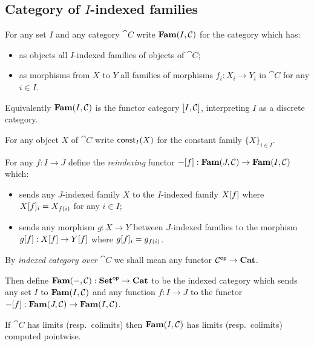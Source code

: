 \subsection{Category of $I$-indexed families}
\label{sec:fam}

\begin{definition}
For any set $I$ and any category $\cat{C}$ write $\mathbf{Fam}(I,\mathcal{C})$ for the category which has:
\begin{itemize}
\item as objects all $I$-indexed families of objects of $\cat{C}$;
\item as morphisms from $X$ to $Y$ all families of morphisms $f_i: X_i \to Y_i$ in $\cat{C}$ for any $i \in
I$.
\end{itemize}
\end{definition}

\noindent Equivalently $\mathbf{Fam}(I,\mathcal{C})$ is the functor category $[I,\mathcal{C}]$, interpreting $I$ as a
discrete category.

\begin{definition}
For any object $X$ of $\cat{C}$ write $\mathsf{const}_I(X)$ for the constant family $\{X\}_{i \in I}$.
\end{definition}

\begin{definition}[Reindexing]
For any $f: I \to J$ define the \emph{reindexing} functor $-[f]: \mathbf{Fam}(J,\mathcal{C}) \to
\mathbf{Fam}(I,\mathcal{C})$ which:
\begin{itemize}
\item sends any $J$-indexed family $X$ to the $I$-indexed family $X[f]$ where $X[f]_i =
X_{f(i)}$ for any $i \in I$;
\item sends any morphism $g: X \to Y$ between $J$-indexed families to the morphism $g[f]:
X[f] \to Y[f]$ where $g[f]_i = g_{f(i)}$.
\end{itemize}
\end{definition}

By \emph{indexed category over $\cat{C}$} we shall mean any functor $\mathcal{C}^{\mathsf{op}} \to \mathbf{Cat}$.

\begin{definition}
Then define $\mathbf{Fam}(-,\mathcal{C}): \mathbf{Set}^{\mathsf{op}} \to \mathbf{Cat}$ to be the indexed category which sends any set $I$ to
$\mathbf{Fam}(I,\mathcal{C})$ and any function $f: I \to J$ to the functor $-[f]: \mathbf{Fam}(J,\mathcal{C}) \to
\mathbf{Fam}(I,\mathcal{C})$.
\end{definition}

\begin{proposition}
If $\cat{C}$ has limits (resp.~colimits) then $\mathbf{Fam}(I,\mathcal{C})$ has limits (resp.~colimits) computed
pointwise.
\end{proposition}
